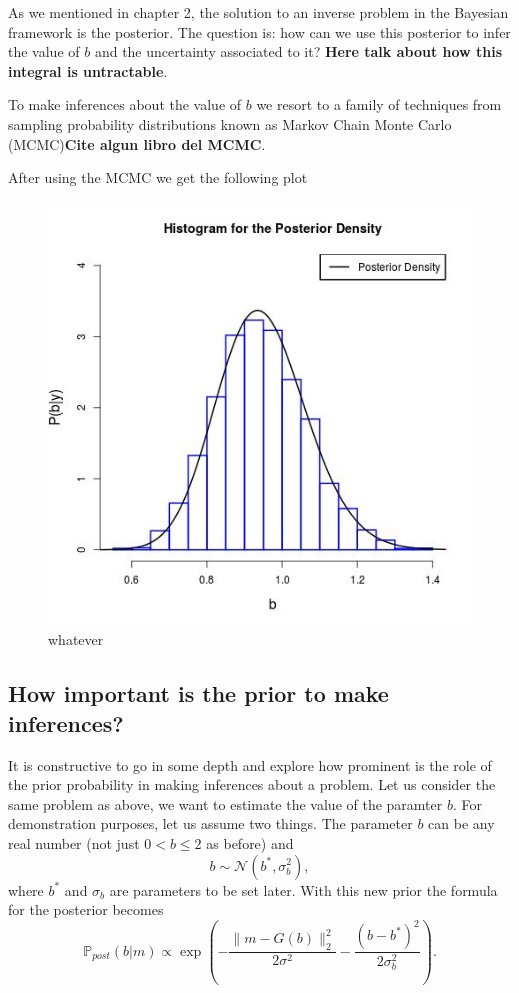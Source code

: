 \documentclass[12pt]{book}
\newcommand{\post}{\mathbb{P}_{post}}
\begin{document}
As we mentioned in chapter 2,
the solution to an inverse problem in the Bayesian framework is the posterior. The question is:
how can we use this posterior to infer the value of $b$ and the uncertainty associated to it? 
\textbf{Here talk about how this integral is untractable}.

To make inferences about the value of $b$ we resort to a family of techniques from sampling probability
distributions known as Markov Chain Monte Carlo (MCMC)\textbf{Cite algun libro del MCMC}.

After using the MCMC we get the following plot 

\begin{figure}[H]
\centering
\includegraphics[scale=0.8]{./FigChap3/histogram_mcmc.jpg}
\caption{whatever}
\end{figure}



\subsection*{How important is the prior to make inferences?}
It is constructive to go in some depth and explore how prominent is the role of the prior probability
in making inferences about a problem. Let us consider the same problem as above, we want to estimate
the value of the paramter $b$. For demonstration purposes, let us assume two things. The parameter
$b$ can be any real number (not just $0<b\leq 2$ as before) and
\begin{equation*}
b\sim\mathscr{N}(b^{*},\sigma_{b}^{2}),
\end{equation*}
where $b^{*}$ and $\sigma_{b}$ are parameters to be set later.  With this new prior the formula
for the posterior becomes 
\begin{equation*}
\post(b|m)\propto \exp\left(-\frac{\|m-G(b)\|_{2}^{2}}{2\sigma^{2}}-\frac{(b-b^{*})^{2}}{2\sigma_{b}^{2}}\right).
\end{equation*}
\end{document}
